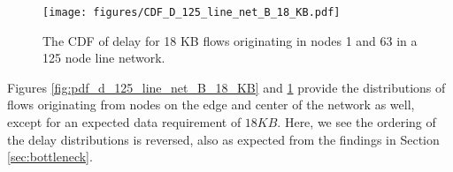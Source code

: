 \begin{figure}
\begin{centering}
    \texttt{[image: figures/CDF\_D\_125\_line\_net\_B\_18\_KB.pdf]}
    \caption{The CDF of delay for 18 KB flows originating in nodes 1 and 63 in a 125 node line network.}
    \label{fig:cdf_d_125_line_net_B_18_KB}
\end{centering}
\end{figure}

Figures \ref{fig:pdf_d_125_line_net_B_18_KB} and \ref{fig:cdf_d_125_line_net_B_18_KB} provide the distributions of flows originating from nodes on the edge and center of the network as well, except for an expected data requirement of $18 KB$.  Here, we see the ordering of the delay distributions is reversed, also as expected from the findings in Section \ref{sec:bottleneck}.

%



